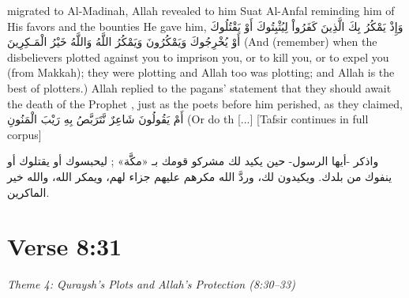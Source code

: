 \documentclass[11pt,a4paper,openany]{book}
\let\textAR\textarabic
\begin{document}
\begin{tafsirbox}
migrated to Al-Madinah, Allah revealed to him Suat Al-Anfal reminding him of His favors and the bounties He gave him, \textAR{وَإِذْ} \textAR{يَمْكُرُ} \textAR{بِكَ} \textAR{الَّذِينَ} \textAR{كَفَرُواْ} \textAR{لِيُثْبِتُوكَ} \textAR{أَوْ} \textAR{يَقْتُلُوكَ} \textAR{أَوْ} \textAR{يُخْرِجُوكَ} \textAR{وَيَمْكُرُونَ} \textAR{وَيَمْكُرُ} \textAR{اللَّهُ} \textAR{وَاللَّهُ} \textAR{خَيْرُ} \textAR{الْمَـكِرِينَ} (And (remember) when the disbelievers plotted against you to imprison you, or to kill you, or to expel you (from Makkah); they were plotting and Allah too was plotting; and Allah is the best of plotters.) Allah replied to the pagans' statement that they should await the death of the Prophet , just as the poets before him perished, as they claimed, \textAR{أَمْ} \textAR{يَقُولُونَ} \textAR{شَاعِرٌ} \textAR{نَّتَرَبَّصُ} \textAR{بِهِ} \textAR{رَيْبَ} \textAR{الْمَنُونِ} (Or do th [...] [Tafsir continues in full corpus]
\end{tafsirbox}


\begin{muyassarbox}
\textAR{واذكر -أيها الرسول- حين يكيد لك مشركو قومك بـ «مكَّة» ; ليحبسوك أو يقتلوك أو ينفوك من بلدك. ويكيدون لك، وردَّ الله مكرهم عليهم جزاء لهم، ويمكر الله، والله خير الماكرين.}
\end{muyassarbox}


\newpage

\section{Verse 8:31}
{\small\color{accent2}\itshape Theme 4: Quraysh's Plots and Allah's Protection (8:30--33)}
\end{document}
